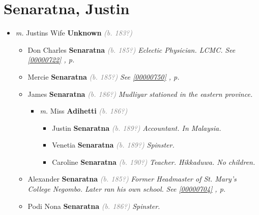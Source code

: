\documentclass[10pt, openany]{book}
\begin{document}
\chapter{Senaratna, Justin}
\label{00000734}
\textcolor{slmaroon}{\textit{}}
\begin{itemize}
\item{\textit{m.} Justins Wife \textbf{Unknown} \textcolor{gray}{\textit{(b. 183?)}}   \label{couple:00000734:00000885} \begin{itemize}
\item{Don Charles \textbf{Senaratna} \textcolor{gray}{\textit{(b. 185?)}} \textcolor{slmaroon}{\textit{Eclectic Physician.
LCMC.}} \textcolor{slteal}{\textit{See  \autoref{00000722} \textit{, p. \pageref{00000722} }}}}
\item{Mercie \textbf{Senaratna} \textcolor{gray}{\textit{(b. 185?)}} \textcolor{slteal}{\textit{See  \autoref{00000750} \textit{, p. \pageref{00000750} }}}}
\item{James \textbf{Senaratna} \textcolor{gray}{\textit{(b. 186?)}} \textcolor{slmaroon}{\textit{Mudliyar stationed in the eastern province.}}
\begin{itemize}
\item{\textit{m.} Miss \textbf{Adihetti} \textcolor{gray}{\textit{(b. 186?)}}   \label{couple:00000052:00000730} \begin{itemize}
\item{Justin \textbf{Senaratna} \textcolor{gray}{\textit{(b. 189?)}} \textcolor{slmaroon}{\textit{Accountant.
In Malaysia.}}
 }
\item{Venetia \textbf{Senaratna} \textcolor{gray}{\textit{(b. 189?)}} \textcolor{slmaroon}{\textit{Spinster.}}
 }
\item{Caroline \textbf{Senaratna} \textcolor{gray}{\textit{(b. 190?)}} \textcolor{slmaroon}{\textit{Teacher.
Hikkaduwa. No children.}}
 }
\end{itemize}}
\end{itemize}
 }
\item{Alexander \textbf{Senaratna} \textcolor{gray}{\textit{(b. 185?)}} \textcolor{slmaroon}{\textit{Former Headmaster of St. Mary's College Negombo. Later ran his own school.}} \textcolor{slteal}{\textit{See  \autoref{00000704} \textit{, p. \pageref{00000704} }}}}
\item{Podi Nona \textbf{Senaratna} \textcolor{gray}{\textit{(b. 186?)}} \textcolor{slmaroon}{\textit{Spinster.}}
}
\end{itemize}}
\end{itemize}
\end{document}
